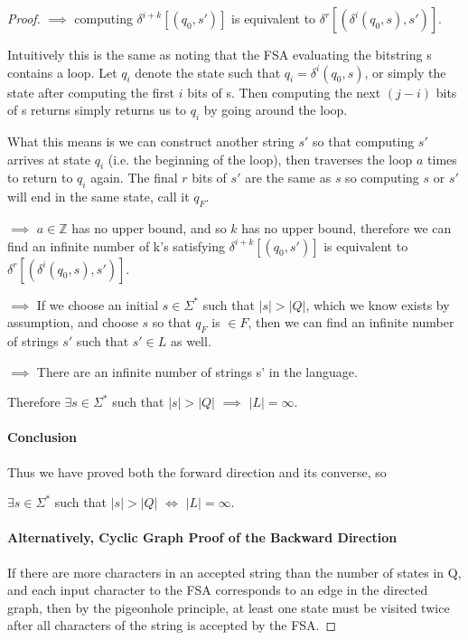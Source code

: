 \documentclass[11pt]{article}
\begin{document}
\begin{proof}
$\implies$ computing $\delta^{i+k}[(q_0,s')]$ is equivalent to $\delta^{r}[(\delta^{i}(q_0,s),s')]$.

Intuitively this is the same as noting that the FSA evaluating the bitstring s contains a loop. Let $q_{i}$ denote the state such that $q_{i} = \delta^{i}(q_{0},s)$, or simply the state after computing the first $i$ bits of s. Then computing the next $(j-i)$ bits of s returns simply returns us to $q_{i}$ by going around the loop.

What this means is we can construct another string $s'$ so that computing $s'$ arrives at state $q_{i}$ (i.e. the beginning of the loop), then traverses the loop $a$ times to return to $q_{i}$ again. The final $r$ bits of $s'$ are the same as $s$ so computing $s$ or $s'$ will end in the same state, call it $q_{F}$.

$\implies$ $a \in \mathbb{Z}$ has no upper bound, and so $k$ has no upper bound, therefore we can find an infinite number of k's satisfying $\delta^{i+k}[(q_0,s')]$ is equivalent to $\delta^{r}[(\delta^{i}(q_0,s),s')]$.

$\implies$ If we choose an initial $s \in \Sigma^*$ such that $|s| > |Q|$, which we know exists by assumption, and choose $s$ so that $q_{F}$ is $\in F$, then we can find an infinite number of strings $s'$ such that $s' \in L$ as well.

$\implies$ There are an infinite number of strings s' in the language.

Therefore $\exists s\in \Sigma^* $ such that $|s| > |Q|$ $\implies$ $|L| = \infty$.

\paragraph{Conclusion}
Thus we have proved both the forward direction and its converse, so

$\exists s\in \Sigma^* $ such that $|s| > |Q|$ $\iff$ $|L| = \infty$.

\paragraph{Alternatively, Cyclic Graph Proof of the Backward Direction}

If there are more characters in an accepted string than the number of states in Q, and each input character to the FSA corresponds to an edge in the directed graph, then by the pigeonhole principle, at least one state must be visited twice after all characters of the string is accepted by the FSA.


\end{proof}
\end{document}
